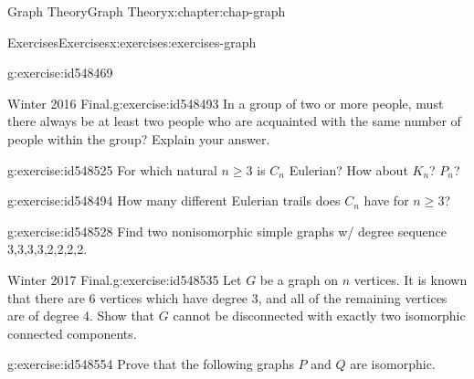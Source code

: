 \documentclass[oneside,10pt,]{book}
\numberwithin{equation}{section}
\begin{document}
\begin{chapterptx}{Graph Theory}{}{Graph Theory}{}{}{x:chapter:chap-graph}
\begin{exercises-section}{Exercises}{}{Exercises}{}{}{x:exercises:exercises-graph}
\begin{divisionexercise}{6}{}{}{g:exercise:id548469}
\end{divisionexercise}%
\begin{divisionexercise}{7}{Winter 2016 Final.}{}{g:exercise:id548493}%
In a group of two or more people, must there always be at least two people who are acquainted with the same number of people within the group? Explain your answer.%
\end{divisionexercise}%
\begin{divisionexercise}{8}{}{}{g:exercise:id548525}%
For which natural \(n \geq 3\) is \(C_n\) Eulerian? How about \(K_n\)? \(P_n\)?%
\end{divisionexercise}%
\begin{divisionexercise}{9}{}{}{g:exercise:id548494}%
How many different Eulerian trails does \(C_n\) have for \(n \geq 3\)?%
\end{divisionexercise}%
\begin{divisionexercise}{10}{}{}{g:exercise:id548528}%
Find two nonisomorphic simple graphs w\slash{} degree sequence 3,3,3,3,2,2,2,2.%
\end{divisionexercise}%
\begin{divisionexercise}{11}{Winter 2017 Final.}{}{g:exercise:id548535}%
Let \(G\) be a graph on \(n\) vertices. It is known that there are 6 vertices which have degree 3, and all of the remaining vertices are of degree 4. Show that \(G\) cannot be disconnected with exactly two isomorphic connected components.%
\end{divisionexercise}%
\begin{divisionexercise}{12}{}{}{g:exercise:id548554}%
Prove that the following graphs \(P\) and \(Q\) are isomorphic.%
\begin{sidebyside}{2}{0.25}{0.25}{0.04}%
\begin{sbspanel}{0.24}%
\end{sbspanel}
\end{sidebyside}
\end{divisionexercise}
\end{exercises-section}
\end{chapterptx}
\end{document}
